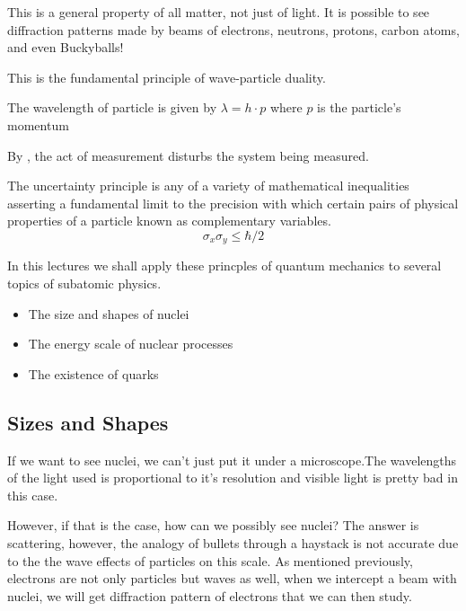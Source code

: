 \documentclass[english, 11pt]{article}
\begin{document}
    This is a general property of all matter, not just of light. It is possible to see diffraction patterns made by beams of electrons, neutrons, protons, carbon atoms, and even Buckyballs!

    This is the fundamental principle of wave-particle duality.

    \begin{defn}
      The wavelength of particle is given by $\lambda = h\cdot p$ where $p$ is the particle's momentum
    \end{defn}

    By , the act of measurement disturbs the system being measured.

    \begin{defn}\label{hup}
      The uncertainty principle is any of a variety of mathematical inequalities asserting a fundamental limit to the precision with which certain pairs of physical properties of a particle known as complementary variables.
      \[ \sigma_x \sigma_y \leq \hbar/2 \]
    \end{defn}

    In this lectures we shall apply these princples of quantum mechanics to several topics of subatomic physics.

    \begin{itemize}
      \item The size and shapes of nuclei
      \item The energy scale of nuclear processes
      \item The existence of quarks
    \end{itemize}

    \subsection{Sizes and Shapes}

      If we want to see nuclei, we can't just put it under a microscope.The wavelengths of the light used is proportional to it's resolution and visible light is pretty bad in this case. 

      However, if that is the case, how can we possibly see nuclei? The answer is scattering, however, the analogy of bullets through a haystack is not accurate due to the the wave effects of particles on this scale. As mentioned previously, electrons are not only particles but waves as well, when we intercept a beam with nuclei, we will get diffraction pattern of electrons that we can then study. \\ 
\end{document}
